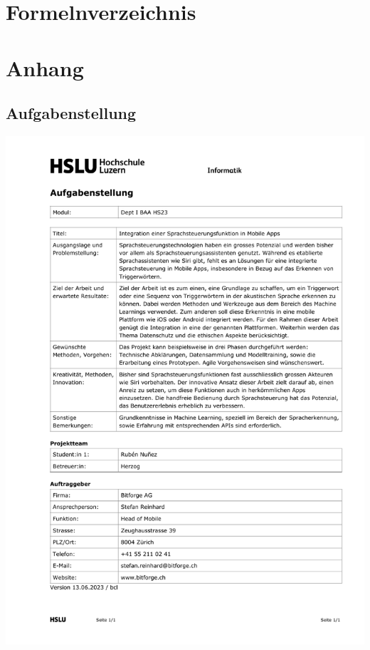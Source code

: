 \documentclass[11pt,a4paper]{article}
\begin{document}
\clearpage


\printbibliography[title=Literaturverzeichnis, heading=bibintoc]

\listoffigures

\listoftables

\section*{Formelnverzeichnis}
\vspace{-6ex}
\listofformulas



\newpage \section{Anhang}
\subsection{Aufgabenstellung}
\includegraphics[width=1\linewidth]{Aufgabenstellung_BAA.pdf}
\end{document}
